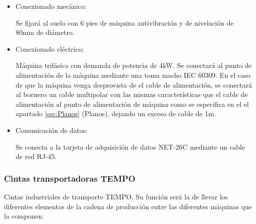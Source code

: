 		\begin{itemize}
				\item{Conexionado mecánico:}
				
				Se fijará al suelo con 6 pies de máquina antivibración y de nivelación de 80mm de diámetro.

				\item{Conexionado eléctrico:}

				Máquina trifásica con demanda de potencia de 4kW. Se conectará al punto de alimentación de la máquina mediante una  toma macho IEC 60309. En el caso de que la máquina venga desprovista de el cable de alimentación, se conectará al bornero un cable multipolar con las mismas características que el cable de alimentación al punto de alimentación de máquina como se especifica en el el apartado \ref{sec:Planos} (Planos), dejando un exceso de cable de 1m. \
				
				\item{Comunicación de datos:}

				Se conecta a la tarjeta de adquisición de datos NET-26C mediante un cable de red RJ-45.
		\end{itemize}

\newpage


	\subsubsection{Cintas transportadoras TEMPO}

	

	Cintas industriales de transporte TEMPO. Su función será la de llevar los diferentes elementos de la cadena de producción entre las diferentes máquinas que la componen. \\

